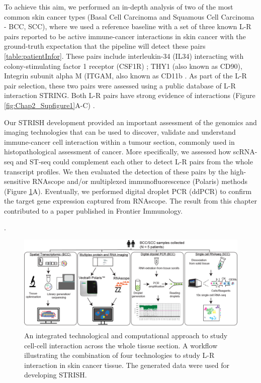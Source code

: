 To achieve this aim, we performed an in-depth analysis of two of the most common skin cancer types (Basal Cell Carcinoma and Squamous Cell Carcinoma - BCC, SCC), where we used a reference baseline with a set of three known L-R pairs reported to be active immune-cancer interactions in skin cancer with the ground-truth expectation that the pipeline will detect these pairs \ref{table:patientInfor}. These pairs include interleukin-34 (IL34) interacting with colony-stimulating factor 1 receptor (CSF1R) \cite{lin2008discovery};  THY1 (also known as CD90), Integrin subunit alpha M (ITGAM, also known as CD11b \cite{wetzel2004human}. As part of the L-R pair selection, these two pairs were assessed using a public database of L-R interaction STRING. Both L-R pairs have strong evidence of interactions (Figure \ref{fig:Chap2_Supfigure1}A-C) \cite{jensen2009string}. 

Our STRISH development provided an important assessment of the genomics and imaging technologies that can be used to discover, validate and understand immune-cancer cell interaction within a tumour section, commonly used in histopathological assessment of cancer. More specifically, we assessed how scRNA-seq and ST-seq could complement each other to detect L-R pairs from the whole transcript profiles. We then evaluated the detection of these pairs by the high-sensitive RNAscope and/or multiplexed immunofluorescence (\ie Polaris) methods (Figure \ref{fig:Chap2_figure1}A). Eventually, we performed digital droplet PCR (ddPCR) to confirm the target gene expression captured from RNAscope. The result from this chapter contributed to a paper published in Frontier Immunology. 

\cite{tran2022robust}.  
\begin{figure}[htp]
    \centering
    \includegraphics[width=\columnwidth]{Chapter2/Figures/Chapter2_techsum_figure1.png}
    \caption[An integrated technological and computational approach to study cell-cell interaction across the whole tissue section.]{ An integrated technological and computational approach to study cell-cell interaction across the whole tissue section. A workflow illustrating the combination of four technologies to study L-R interaction in skin cancer tissue. The generated data were used for developing STRISH.}
    \label{fig:Chap2_figure1}
\end{figure}

